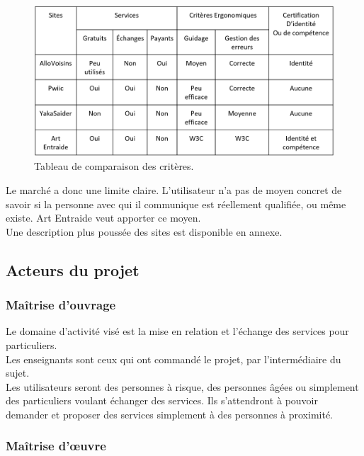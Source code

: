 \documentclass[a4paper,11pt]{article}
\begin{document}
\begin{figure}[H]
  \includegraphics[width=\linewidth]{images/tableau-ergo.png}
  \caption{Tableau de comparaison des critères.}
  \label{fig:table1}
\end{figure}

Le marché a donc une limite claire. L'utilisateur n'a pas de moyen concret de savoir si la personne avec qui il communique est réellement qualifiée, ou même existe.
Art Entraide veut apporter ce moyen.\\

Une description plus poussée des sites est disponible en annexe.\\


\subsection{Acteurs du projet}
\subsubsection{Maîtrise d’ouvrage}

Le domaine d’activité visé est la mise en relation et l’échange des services pour particuliers.\\

Les enseignants sont ceux qui ont commandé le projet, par l’intermédiaire du sujet.\\

Les utilisateurs seront des personnes à risque, des personnes âgées ou simplement des particuliers
voulant échanger des services. Ils s’attendront à pouvoir demander et proposer des services
simplement à des personnes à proximité.\\

\subsubsection{Maîtrise d'œuvre}
\end{document}
